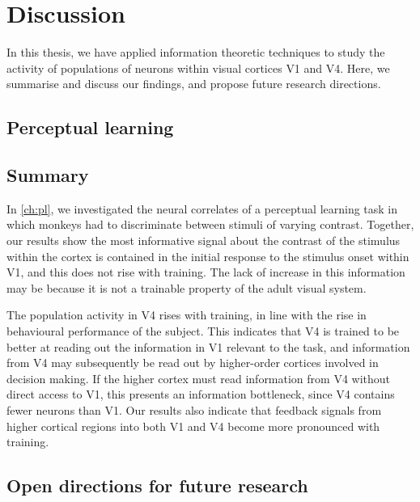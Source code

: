 \chapter{Discussion}

In this thesis, we have applied information theoretic techniques to study the activity of populations of neurons within visual cortices \ac{V1} and \ac{V4}.
Here, we summarise and discuss our findings, and propose future research directions.


\section{Perceptual learning}

\section{Summary}

In \autoref{ch:pl}, we investigated the neural correlates of a perceptual learning task in which monkeys had to discriminate between stimuli of varying contrast.
Together, our results show the most informative signal about the contrast of the stimulus within the cortex is contained in the initial response to the stimulus onset within \ac{V1}, and this does not rise with training.
The lack of increase in this information may be because it is not a trainable property of the adult visual system.

The population activity in \ac{V4} rises with training, in line with the rise in behavioural performance of the subject.
This indicates that \ac{V4} is trained to be better at reading out the information in \ac{V1} relevant to the task, and information from \ac{V4} may subsequently be read out by higher-order cortices involved in decision making.
If the higher cortex must read information from \ac{V4} without direct access to \ac{V1}, this presents an information bottleneck, since \ac{V4} contains fewer neurons than \ac{V1}.
Our results also indicate that feedback signals from higher cortical regions into both \ac{V1} and \ac{V4} become more pronounced with training.


\section{Open directions for future research}

